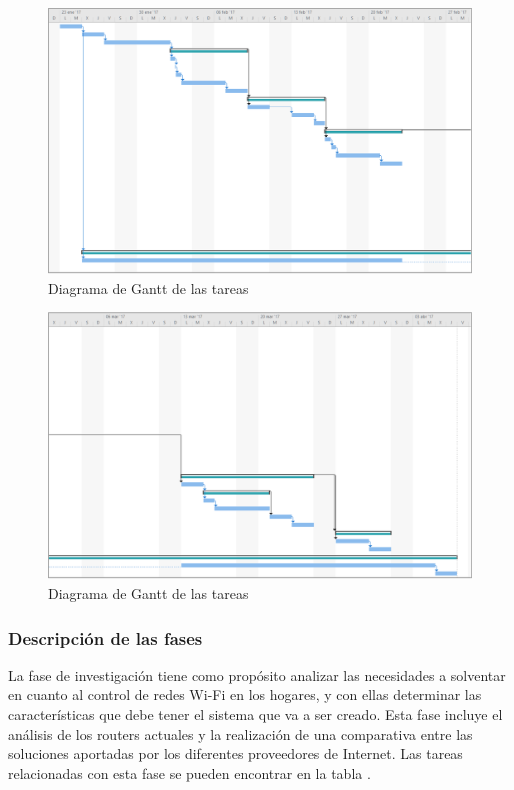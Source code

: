 \documentclass[12pt]{article}
\begin{document}
        \begin{figure}[h!]
            \centering
                \includegraphics[scale=0.5]{tasks_gantt0.eps}
                \caption*{Diagrama de Gantt de las tareas}
                \label{fig:tasks_gantt0}
        \end{figure}

        \begin{figure}[h!]
            \centering
                \includegraphics[scale=0.5]{tasks_gantt1.eps}
                \caption*{Diagrama de Gantt de las tareas}
                \label{fig:tasks_gantt1}
        \end{figure}

        \clearpage

        \subsubsection{Descripción de las fases}
            La fase de investigación tiene como propósito analizar las necesidades a solventar en cuanto al control de redes Wi-Fi en los hogares, y con ellas determinar las características que debe tener el sistema que va a ser creado. Esta fase incluye el análisis de los routers actuales y la realización de una comparativa entre las soluciones aportadas por los diferentes proveedores de Internet. Las tareas relacionadas con esta fase se pueden encontrar en la tabla .
\end{document}
